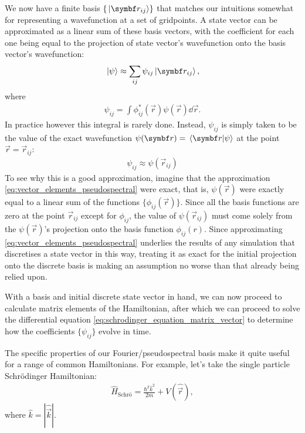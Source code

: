 We now have a finite basis $\{\ket{\vec r_{ij}}\}$ that matches our intuitions somewhat for representing a wavefunction at a set of gridpoints. A state vector can be approximated as a linear sum of these basis vectors, with the coefficient for each one being equal to the projection of state vector's wavefunction onto the basis vector's wavefunction:
\begin{align}\label{eq:vector_elements_pseudospectral}
\ket{\psi} \approx \sum_{ij} \psi_{ij} \ket{\vec r_{i j}},
\end{align}
where
\begin{align}
\psi_{i j} = \int \phi_{ij}^*(\vec r) \psi(\vec r) \dd{\vec r}.
\end{align}
In practice however this integral is rarely done. Instead, $\psi_{ij}$ is simply taken to be the value of the exact wavefunction $\psi(\vec r) = \braket{\vec r}{\psi}$ at the point $\vec r = \vec r_{ij}$:
\begin{align}\label{eq:pseudospectral_vector}
\psi_{i j} \approx \psi(\vec r_{ij})
\end{align}
 To see why this is a good approximation, imagine that the approximation \eqref{eq:vector_elements_pseudospectral} were exact, that is, $\psi(\vec r)$ were exactly equal to a linear sum of the functions $\{\phi_{ij}(\vec r)\}$. Since all the basis functions are zero at the point $\vec r_{ij}$ except for $\phi_{ij}$, the value of $\psi(\vec r_{ij})$ must come solely from the $\psi(\vec r)$'s projection onto the basis function $\phi_{ij}(r)$. Since approximating \eqref{eq:vector_elements_pseudospectral} underlies the results of any simulation that discretises a state vector in this way, treating it as exact for the initial projection onto the discrete basis is making an assumption no worse than that already being relied upon.


With a basis and initial discrete state vector in hand, we can now proceed to calculate matrix elements of the Hamiltonian, after which we can proceed to solve the differential equation \eqref{eq:schrodinger_equation_matrix_vector} to determine how the coefficients $\{\psi_{ij}\}$ evolve in time.

The specific properties of our Fourier/pseudospectral basis make it quite useful for a range of common Hamiltonians. For example, let's take the single particle Schr\"odinger Hamiltonian:
\begin{align}
\hat H_\textrm{Schr\"o} = \frac{\hbar^2 \hat k ^2}{2m}  + V(\hat {\vec r}),
\end{align}
where $\hat k = |\hat{\vec k}|$.

